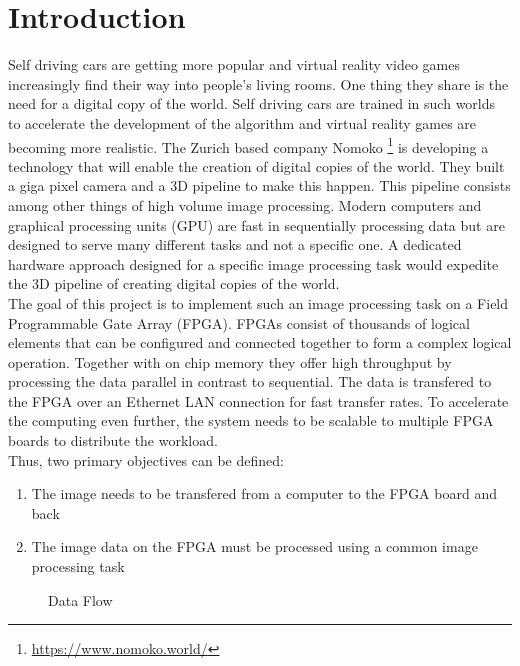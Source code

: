 
%
%
\chapter{Introduction}
Self driving cars are getting more popular and virtual reality video games
increasingly find their way into people's living rooms. One thing they share is
the need for a digital copy of the world. Self driving cars are trained in such
worlds to
accelerate the development of the algorithm and virtual reality games are
becoming more realistic. The Zurich based company Nomoko \footnote{
\url{https://www.nomoko.world/}} is developing a
technology that will enable the creation of digital copies of the world. They
built a giga pixel camera and a 3D pipeline to make this happen. This pipeline
consists among other things of high volume image processing. Modern computers
and graphical processing units (GPU) are fast in sequentially processing data
but are designed to serve many different tasks and not a specific one. A
dedicated hardware approach designed for a specific image processing task would
expedite the 3D pipeline of creating digital copies of the world.
\\

The goal of this project is to implement such an image processing task on a
Field
Programmable Gate Array (FPGA). FPGAs
consist of thousands of logical elements that can be configured and connected
together to form a complex logical operation. Together with on chip
memory they offer high throughput by processing the data parallel in contrast to
sequential. The data is transfered to the FPGA over an Ethernet LAN connection
for
fast transfer rates. To accelerate the computing even further, the system needs
to be scalable to multiple FPGA boards to distribute the workload.
\\

Thus, two primary objectives can be defined:
\begin{enumerate}
    \item The image needs to be transfered from a computer to the FPGA board and
    back
    \item The image data on the FPGA must be processed using a common
    image processing task
\end{enumerate}
\begin{figure}[t!]
    \centering
    
    \caption{Data Flow}
    \label{fig:datafl}
\end{figure}

